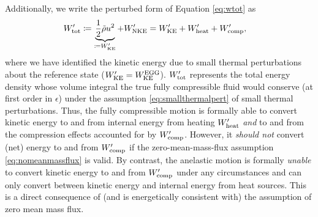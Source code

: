 \documentclass[12pt]{article}
\newcommand{\wptot}{W^\prime_{\rm tot}}
\newcommand{\wpke}{W^\prime_{\rm KE}}
\newcommand{\wpnke}{W^\prime_{\rm NKE}}
\newcommand{\wpheat}{W^\prime_{\rm heat}}
\newcommand{\wpcomp}{W^\prime_{\rm comp}}
\newcommand{\eggwke}{W^{\rm EGG}_{\rm KE}}
\begin{document}
Additionally, we write the perturbed form of Equation \eqref{eq:wtot} as
	\begin{align}\label{eq:wpke}
		\wptot &\define \underbrace{\frac{1}{2}\rhotilde u^2}_{\define \wpke} + \wpnke = \wpke + \wpheat + \wpcomp,
	\end{align}
where we have identified the kinetic energy due to small thermal perturbations about the reference state ($\wpke=\eggwke$). $\wptot$ represents the total energy density whose volume integral the true fully compressible fluid would conserve (at first order in $\epsilon$) under the assumption \eqref{eq:smallthermalpert} of small thermal perturbations. Thus, the fully compressible motion is formally able to convert kinetic energy to and from internal energy from heating $\wpheat$ \textit{and} to and from the compression effects accounted for by $\wpcomp$. However, it \textit{should not} convert (net) energy to and from $\wpcomp$ if the zero-mean-mass-flux assumption \eqref{eq:nomeanmassflux} is valid. By contrast, the anelastic motion is formally \textit{unable} to convert kinetic energy to and from $\wpcomp$ under any circumstances and can only convert between kinetic energy and internal energy from heat sources. This is a direct consequence of (and is energetically consistent with) the assumption of zero mean mass flux. 
\end{document}
